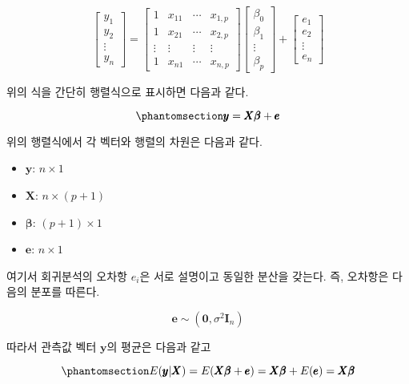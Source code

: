 \documentclass[
  11pt,
  a4paper,
  oneside]{scrbook}
\providecommand{\tightlist}{%
  \setlength{\itemsep}{0pt}\setlength{\parskip}{0pt}}\usepackage{longtable,booktabs,array}
\theoremstyle{definition}
\theoremstyle{plain}
\theoremstyle{definition}
\theoremstyle{definition}
\theoremstyle{remark}
\begin{document}
\[ 
\begin{bmatrix}
y_{1} \\
y_{2} \\
\vdots \\
y_{n}
\end{bmatrix} =
\begin{bmatrix}
1 & x_{11} & \cdots & x_{1,p} \\
1 & x_{21} & \cdots & x_{2,p} \\
\vdots & \vdots & \vdots & \vdots \\
1 & x_{n1} & \cdots & x_{n,p}
\end{bmatrix}
\begin{bmatrix}
\beta_{0} \\
\beta_{1} \\
\vdots \\
\beta_{p}
\end{bmatrix}
+
\begin{bmatrix}
 e_{1} \\
 e_{2} \\
\vdots \\
 e_{n}
\end{bmatrix}
\]

위의 식을 간단히 행렬식으로 표시하면 다음과 같다.

\begin{equation}\phantomsection\label{eq-multireg2}{
\pmb y = \pmb X \pmb \beta + \pmb e
}\end{equation}

위의 행렬식에서 각 벡터와 행렬의 차원은 다음과 같다.

\begin{itemize}
\tightlist
\item
  \(\pmb y\): \(n \times 1\)
\item
  \(\pmb X\): \(n \times (p+1)\)
\item
  \(\pmb \beta\): \((p+1) \times 1\)
\item
  \(\pmb e\): \(n \times 1\)
\end{itemize}

여기서 회귀분석의 오차항 \(e_i\)은 서로 설명이고 동일한 분산을 갖는다.
즉, 오차항은 다음의 분포를 따른다.

\[ \pmb e  \sim (\pmb 0,\sigma^2 \pmb I_n) \]

따라서 관측값 벡터 \(\pmb y\)의 평균은 다음과 같고

\begin{equation}\phantomsection\label{eq-multiregmean}{
E(\pmb y|\pmb X) = E(\pmb X \pmb \beta+\pmb e)= \pmb X \pmb \beta + E(\pmb e) = \pmb X \pmb \beta
}\end{equation}
\end{document}
